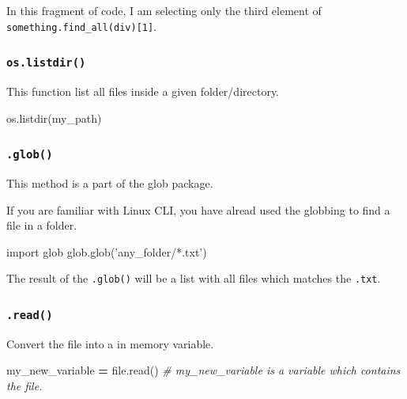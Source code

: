 \documentclass[]{book}
\newenvironment{Shaded}{\begin{snugshade}}{\end{snugshade}}
\newcommand{\StringTok}[1]{\textcolor[rgb]{0.31,0.60,0.02}{#1}}
\newcommand{\ImportTok}[1]{#1}
\newcommand{\CommentTok}[1]{\textcolor[rgb]{0.56,0.35,0.01}{\textit{#1}}}
\newcommand{\OperatorTok}[1]{\textcolor[rgb]{0.81,0.36,0.00}{\textbf{#1}}}
\newcommand{\BuiltInTok}[1]{#1}
\newcommand{\NormalTok}[1]{#1}
\begin{document}
In this fragment of code, I am selecting only the third element of
\texttt{something.find\_all(\textquotesingle{}div\textquotesingle{}){[}1{]}}.

\subsubsection{\texorpdfstring{\texttt{os.listdir()}}{os.listdir()}}\label{os.listdir}

This function list all files inside a given folder/directory.

\begin{Shaded}
\begin{Highlighting}[]
\NormalTok{os.listdir(my_path)}
\end{Highlighting}
\end{Shaded}

\subsubsection{\texorpdfstring{\texttt{.glob()}}{.glob()}}\label{glob}

This method is a part of the glob package.

If you are familiar with Linux CLI, you have alread used the globbing to
find a file in a folder.

\begin{Shaded}
\begin{Highlighting}[]
\ImportTok{import}\NormalTok{ glob}
\NormalTok{glob.glob(}\StringTok{'any_folder/*.txt'}\NormalTok{)}
\end{Highlighting}
\end{Shaded}

The result of the \texttt{.glob()} will be a list with all files which
matches the \texttt{.txt}.

\subsubsection{\texorpdfstring{\texttt{.read()}}{.read()}}\label{read}

Convert the file into a in memory variable.

\begin{Shaded}
\begin{Highlighting}[]
\NormalTok{my_new_variable }\OperatorTok{=} \BuiltInTok{file}\NormalTok{.read() }\CommentTok{# my_new_variable is a variable which contains the file.}
\end{Highlighting}
\end{Shaded}
\end{document}
